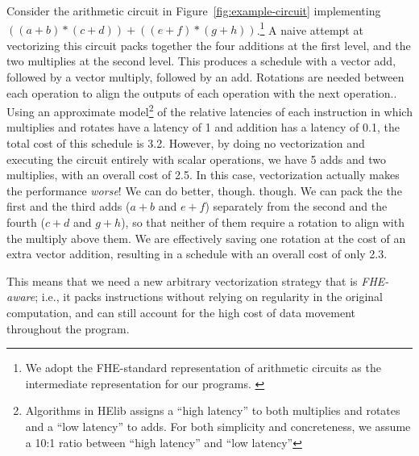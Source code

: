 %
Consider the arithmetic circuit in Figure~\ref{fig:example-circuit} implementing $((a + b) * (c + d)) + ((e + f) * (g + h))$.\footnote{We adopt the FHE-standard representation of arithmetic circuits as the intermediate representation for our programs. \cite{Gentry,CircuitRewriting,Ramparts,Porcupine}}
A naive attempt at vectorizing this circuit packs together the four additions at the first level, and the two multiplies at the second level.
This produces a schedule with a vector add, followed by a vector multiply, followed by an add. Rotations are needed between each operation to align the outputs of each operation with the next operation..
Using an approximate model\footnote{Algorithms in HElib \cite{AlgosHElib} assigns a ``high latency'' to both multiplies and rotates and a ``low latency'' to adds. For both simplicity and concreteness, we assume a 10:1 ratio between ``high latency'' and ``low latency''} of the relative latencies of each instruction in which multiplies and rotates have a latency of 1 and addition has a latency of 0.1, the total cost of this schedule is 3.2.
However, by doing no vectorization and executing the circuit entirely with scalar operations, we have 5 adds and two multiplies, with an overall cost of 2.5.
In this case, vectorization actually makes the performance {\em worse}!
We can do better, though. though.
We can pack the the first and the third adds ($a + b$ and $e + f$) separately from the second and the fourth ($c + d$ and $g + h$), so that neither of them require a rotation to align with the multiply above them.
We are effectively saving one rotation at the cost of an extra vector addition, resulting in a schedule with an overall cost of only 2.3. 

This means that we need a new arbitrary vectorization strategy that is {\em FHE-aware}; i.e., it packs instructions without relying on regularity in the original computation, and can still account for the high cost of data movement throughout the program.

